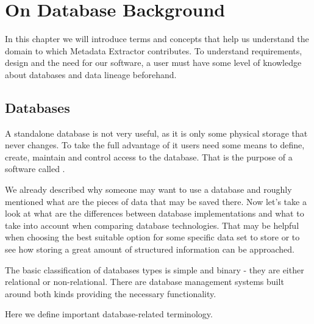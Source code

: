 \chapter{On Database Background}
\label{on_database_background}

In this chapter we will introduce terms and concepts that help us understand the domain to which Metadata Extractor contributes. To understand requirements, design and the need for our software, a user must have some level of knowledge about databases and data lineage beforehand.

\section{Databases}

A standalone database is not very useful, as it is only some physical storage that never changes. To take the full advantage of it users need some means to define, create, maintain and control access to the database. That is the purpose of a software called .

We already described why someone may want to use a database and roughly mentioned what are the pieces of data that may be saved there. 
Now let's take a look at what are the differences between database implementations and what to take into account when comparing database technologies.
That may be helpful when choosing the best suitable option for some specific data set to store or to see how storing a great amount of structured information can be approached.

The basic classification of databases types is simple and binary - they are either relational or non-relational. There are database management systems built around both kinds providing the necessary functionality.

Here we define important database-related terminology.


